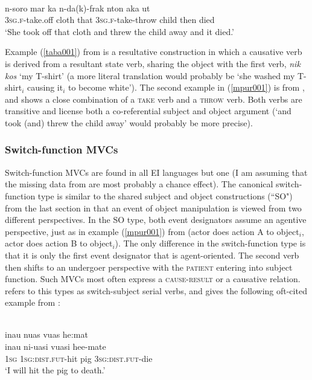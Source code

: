 \ea \label{mpur001}
\\
\gll n-soro mar ka n-da(k)-frak nton aka ut \\
3\textsc{sg}.\textsc{f}-take.off cloth that 3\textsc{sg}.\textsc{f}-take-throw child then died \\
\glft `She took off that cloth and threw the child away and it died.'\\ 
\z

Example (\ref{taba001}) from  is a resultative construction in which a causative verb is derived from a resultant state verb, sharing the object with the first verb, \textit{nik kos} `my T-shirt' (a more literal translation would probably be `she washed my T-shirt$_i$ causing it$_i$ to become white'). The second example in (\ref{mpur001}) is from , and shows a close combination of a \textsc{take} verb and a \textsc{throw} verb. Both verbs are transitive and license both a co-referential subject and object argument (`and took (and) threw the child away' would probably be more precise).

\subsubsection{Switch-function MVCs}

Switch-function MVCs are found in all EI languages but one (I am assuming that the missing data from  are most probably a chance effect). The canonical switch-function type is similar to the shared subject and object constructions (``SO") from the last section in that an event of object manipulation is viewed from two different perspectives. In the SO type, both event designators assume an agentive perspective, just as in example (\ref{mpur001}) from  (actor does action A to object$_i$, actor does action B to object$_i$). The only difference in the switch-function type is that it is only the first event designator that is agent-oriented. The second verb then shifts to an undergoer perspective with the \textsc{patient} entering into subject function. Such MVCs most often express a \textsc{cause-result} or a causative relation. \citet{crowley2002serial} refers to this types as switch-subject serial verbs, and gives the following oft-cited example from :

\ea 
{}\\
\glll inau nuas vuas he:mat \\
inau ni-uasi vuasi hee-mate \\
1\textsc{sg} 1\textsc{sg}:\textsc{dist}.\textsc{fut}-hit pig 3\textsc{sg}:\textsc{dist}.\textsc{fut}-die \\
\glft `I will hit the pig to death.'\\ 
\z

